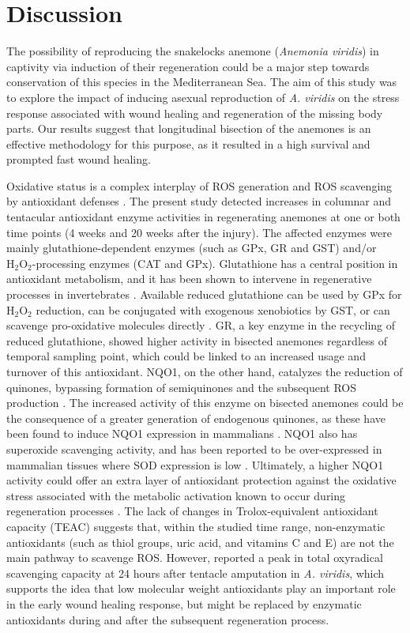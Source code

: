 \documentclass[final,3p,times,authoryear]{elsarticle}
\begin{document}
\section{Discussion}
\label{sec4}

The possibility of reproducing the snakelocks anemone (\textit{Anemonia viridis}) in captivity via induction of their regeneration could be a major step towards conservation of this species in the Mediterranean Sea. The aim of this study was to explore the impact of inducing asexual reproduction of \textit{A. viridis} on the stress response associated with wound healing and regeneration of the missing body parts. Our results suggest that longitudinal bisection of the anemones is an effective methodology for this purpose, as it resulted in a high survival and prompted fast wound healing.

Oxidative status is a complex interplay of ROS generation and ROS scavenging by antioxidant defenses \citep{Gauron2013, Beaulieu2014}. The present study detected increases in columnar and tentacular antioxidant enzyme activities in regenerating anemones at one or both time points (4 weeks and 20 weeks after the injury). The affected enzymes were mainly glutathione-dependent enzymes (such as GPx, GR and GST) and/or $\mathrm{H_2O_2}$-processing enzymes (CAT and GPx). Glutathione has a central position in antioxidant metabolism, and it has been shown to intervene in regenerative processes in invertebrates \citep{Bijnens2021}. Available reduced glutathione can be used by GPx for $\mathrm{H_2O_2}$ reduction, can be conjugated with exogenous xenobiotics by GST, or can scavenge pro-oxidative molecules directly \citep{Couto2016}. GR, a key enzyme in the recycling of reduced glutathione, showed higher activity in bisected anemones regardless of temporal sampling point, which could be linked to an increased usage and turnover of this antioxidant. NQO1, on the other hand, catalyzes the reduction of quinones, bypassing formation of semiquinones and the subsequent ROS production \citep{Atia2020, Ross2021}. The increased activity of this enzyme on bisected anemones could be the consequence of a greater generation of endogenous quinones, as these have been found to induce NQO1 expression in mammalians \citep{Atia2020}. NQO1 also has superoxide scavenging activity, and has been reported to be over-expressed in mammalian tissues where SOD expression is low \citep{Dinkova-Kostova2004, Siegel2004}. Ultimately, a higher NQO1 activity could offer an extra layer of antioxidant protection against the oxidative stress associated with the metabolic activation known to occur during regeneration processes \citep{Atia2020, Mack2025}. The lack of changes in Trolox-equivalent antioxidant capacity (TEAC) suggests that, within the studied time range, non-enzymatic antioxidants (such as thiol groups, uric acid, and vitamins C and E) are not the main pathway to scavenge ROS. However, \citet{LaCorte2025} reported a peak in total oxyradical scavenging capacity at 24 hours after tentacle amputation in \textit{A. viridis}, which supports the idea that low molecular weight antioxidants play an important role in the early wound healing response, but might be replaced by enzymatic antioxidants during and after the subsequent regeneration process. 
\end{document}
